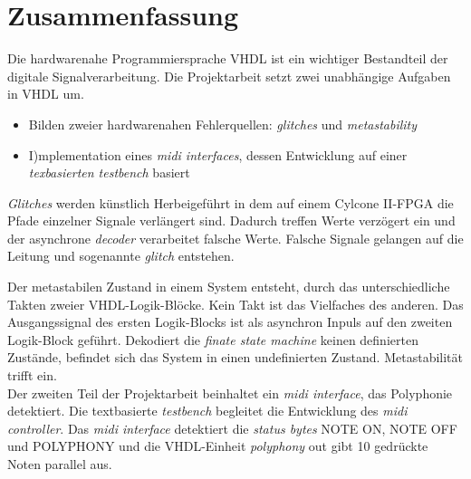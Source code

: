 
\chapter*{Zusammenfassung}


Die hardwarenahe Programmiersprache VHDL ist ein wichtiger Bestandteil der digitale Signalverarbeitung. Die Projektarbeit setzt zwei unabhängige Aufgaben in VHDL um.\\
\begin{itemize}
\item Bilden zweier hardwarenahen Fehlerquellen: \textit{glitches} und \textit{metastability}
	\item I)mplementation eines \textit{midi interfaces}, dessen Entwicklung auf einer \textit{texbasierten testbench} basiert
\end{itemize} 


 \textit{Glitches} werden künstlich Herbeigeführt in dem auf einem Cylcone II-FPGA die Pfade einzelner Signale verlängert sind. Dadurch treffen Werte verzögert ein und der asynchrone \textit{decoder} verarbeitet falsche Werte. Falsche Signale gelangen auf die Leitung und sogenannte \textit{glitch} entstehen. 


Der metastabilen Zustand in einem System entsteht, durch das unterschiedliche Takten zweier VHDL-Logik-Blöcke. Kein Takt ist das Vielfaches des anderen. Das Ausgangssignal des ersten Logik-Blocks ist als asynchron Inpuls auf den zweiten Logik-Block geführt. Dekodiert die \textit{finate state machine} keinen definierten Zustände, befindet sich das System in einen undefinierten Zustand. Metastabilität trifft ein.\\


Der zweiten Teil der Projektarbeit beinhaltet ein \textit{midi interface}, das Polyphonie detektiert. Die textbasierte \textit{testbench} begleitet die Entwicklung des \textit{midi controller}. Das \textit{midi interface} detektiert die \textit{status bytes} NOTE ON, NOTE OFF und POLYPHONY und die VHDL-Einheit \textit{polyphony} out gibt 10 gedrückte Noten parallel aus.\\







